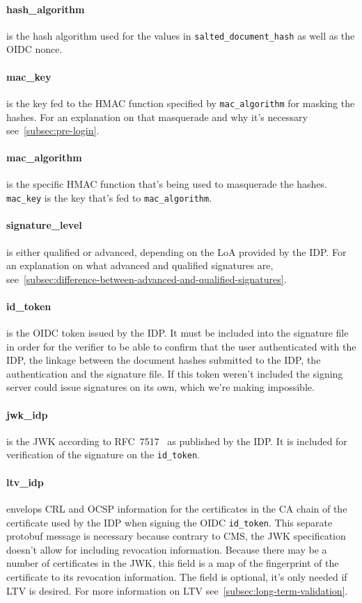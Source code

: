\paragraph{hash\_algorithm} is the hash algorithm used for the values in \texttt{salted\_document\_hash} as well as the \gls{OIDC} nonce.
\paragraph{mac\_key} is the key fed to the \gls{HMAC} function specified by \texttt{mac\_algorithm} for masking the hashes.
For an explanation on that masquerade and why it's necessary see~\ref{subsec:pre-login}.
\paragraph{mac\_algorithm} is the specific \gls{HMAC} function that's being used to masquerade the hashes.
\texttt{mac\_key} is the key that's fed to \texttt{mac\_algorithm}.
\paragraph{signature\_level} is either qualified or advanced, depending on the \gls{LoA} provided by the \gls{IDP}.
For an explanation on what advanced and qualified signatures are, see~\ref{subsec:difference-between-advanced-and-qualified-signatures}.
\paragraph{id\_token} is the \gls{OIDC} token issued by the \gls{IDP}.
It must be included into the signature file in order for the verifier to be able to confirm that the user authenticated with the \gls{IDP},
the linkage between the document hashes submitted to the \gls{IDP}, the authentication and the signature file.
If this token weren't included the signing server could issue signatures on its own, which we're making impossible.
\paragraph{jwk\_idp} is the \gls{JWK} according to RFC~7517~\cite{rfc7517} as published by the \gls{IDP}.
It is included for verification of the signature on the \texttt{id\_token}.
\paragraph{ltv\_idp} envelops \gls{CRL} and \gls{OCSP} information for the certificates in the \gls{CA} chain of the certificate used by the \gls{IDP} when signing the \gls{OIDC} \texttt{id\_token}.
This separate protobuf message is necessary because contrary to \gls{CMS}, the \gls{JWK} specification~\cite{rfc7517} doesn't allow for including revocation information.
Because there may be a number of certificates in the \gls{JWK}, this field is a map of the fingerprint of the certificate to its revocation information.
The field is optional, it's only needed if \gls{LTV} is desired.
For more information on \gls{LTV} see~\ref{subsec:long-term-validation}.

